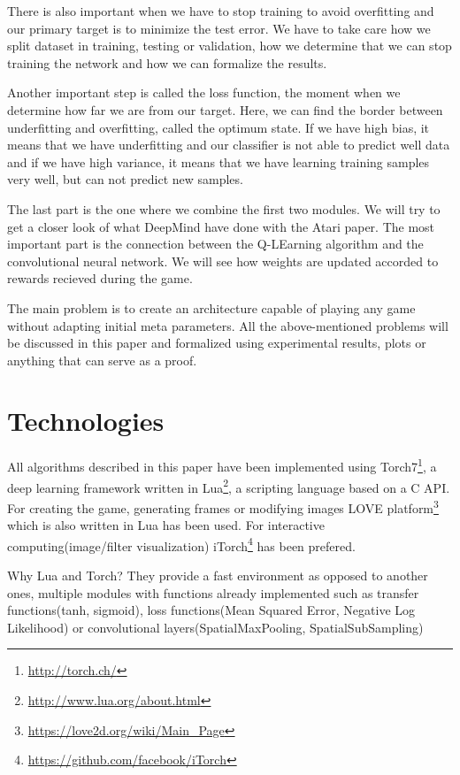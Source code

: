 There is also important when we have to stop training to avoid overfitting and our primary target is to minimize the test error. We have to take care how we split dataset in training, testing or validation, how we determine that we can stop training the network and how we can formalize the results.

Another important step is called the loss function, the moment when we determine how far we are from our target. Here, we can find the border between underfitting and overfitting, called the optimum state. If we have high bias, it means that we have underfitting and our classifier is not able to predict well data and if we have high variance, it means that we have learning training samples very well, but can not predict new samples.

The last part is the one where we combine the first two modules. We will try to get a closer look of what DeepMind have done with the Atari paper\cite{atari}. The most important part is the connection between the Q-LEarning algorithm and the convolutional neural network. We will see how weights are updated accorded to rewards recieved during the game.

The main problem is to create an architecture capable of playing any game without adapting initial meta parameters. All the above-mentioned problems will be discussed in this paper and formalized using experimental results, plots or anything that can serve as a proof.
\newpage

\section{Technologies}
\label{sec:technologies}
All algorithms described in this paper have been implemented using Torch7\footnote{\url{http://torch.ch/}}, a deep learning framework written in Lua\footnote{\url{http://www.lua.org/about.html}}, a scripting language based on a C API. For creating the game, generating frames or modifying images LOVE platform\footnote{\url{https://love2d.org/wiki/Main_Page}} which is also written in Lua has been used. For interactive computing(image/filter visualization) iTorch\footnote{\url{https://github.com/facebook/iTorch}} has been prefered.

Why Lua and Torch? They provide a fast environment as opposed to another ones\cite{torch7}, multiple modules with functions already implemented such as transfer functions(tanh, sigmoid), loss functions(Mean Squared Error, Negative Log Likelihood) or convolutional layers(SpatialMaxPooling, SpatialSubSampling)

